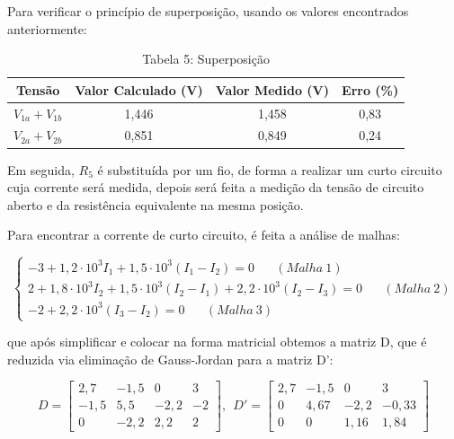 \documentclass[a4 paper]{article}
\begin{document}
\newpage Para verificar o princípio de superposição, usando os valores encontrados anteriormente:

\vspace{5pt}
\begin{table}[h]
\centering
\begin{tabular}{|c|c|c|c|}
\hline
 Tensão&Valor Calculado (V) & Valor Medido (V) & Erro (\%) \\\hline
$V_{1a}+V_{1b}$ &1,446 &1,458 &0,83 \\\hline
$V_{2a}+V_{2b}$ &0,851 &0,849 &0,24 \\\hline
\end{tabular}
\caption*{Tabela 5: Superposição}
\end{table}

Em seguida, $R_5$ é substituída por um fio, de forma a realizar um curto circuito cuja corrente será medida, depois será feita a medição da tensão de circuito aberto e da resistência equivalente na mesma posição.  

Para encontrar a corrente de curto circuito, é feita a análise de malhas:

\begin{equation*}
\left\{
\begin{aligned}
-3+1,2\cdot10^3I_1+1,5\cdot10^3(I_1-I_2)=0\hspace{20pt}(Malha\ 1)\\
2+1,8\cdot10^3I_2+1,5\cdot10^3(I_2-I_1)+2,2\cdot10^3(I_2-I_3)=0\hspace{20pt}(Malha\ 2)\\
-2+2,2\cdot10^3(I_3-I_2)=0\hspace{20pt}(Malha\ 3)
\end{aligned}
\right.
\end{equation*}

\noindent que após simplificar e colocar na forma matricial obtemos a matriz D, que é reduzida via eliminação de Gauss-Jordan para a matriz D':

\[
D=
\begin{bmatrix}
2,7 & -1,5 & 0 & 3\\
-1,5 & 5,5 & -2,2 & -2\\
0 & -2,2 & 2,2 & 2
\end{bmatrix}, \ \ 
D'=
\begin{bmatrix}
2,7 & -1,5 & 0 & 3\\
0 & 4,67 & -2,2 & -0,33\\
0 & 0 & 1,16 & 1,84
\end{bmatrix}
\]
\end{document}
